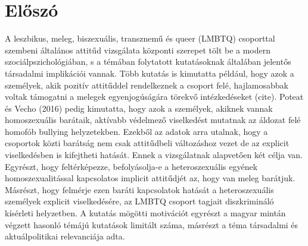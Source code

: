 \section{Előszó}
A leszbikus, meleg, biszexuális, transznemű és queer (LMBTQ) csoporttal szembeni általános attitűd vizsgálata központi szerepet tölt be a modern szociálpszichológiában, s a témában folytatott kutatásoknak általában jelentős társadalmi implikációi vannak. Több kutatás is kimutatta például, hogy azok a személyek, akik pozitív attitűddel rendelkeznek a csoport felé, hajlamosabbak voltak támogatni a melegek egyenjogúságára törekvő intézkedéseket (cite).  Poteat és Vecho (2016) pedig kimutatta, hogy azok a személyek, akiknek vannak homoszexuális barátaik, aktívabb védelmező viselkedést mutatnak az áldozat felé homofób bullying helyzetekben. Ezekből az adatok arra utalnak, hogy a csoportok közti barátság nem csak attitűdbeli változáshoz vezet de az explicit viselkedésben is kifejtheti hatását. Ennek a vizsgálatnak alapvetően két célja van. Egyrészt, hogy feltérképezze, befolyásolja-e a heteroszexuális egyének homoszexualitással kapcsolatos implicit attitűdjét az, hogy van meleg barátjuk. Másrészt, hogy felmérje ezen baráti kapcsolatok hatását a heteroszexuális személyek explicit viselkedésére, az LMBTQ csoport tagjait diszkrimináló kísérleti helyzetben. A kutatás mögötti motivációt egyrészt a magyar mintán végzett hasonló témájú kutatások limitált száma, másrészt a téma társadalmi és aktuálpolitikai relevanciája adta. 
\pagebreak
